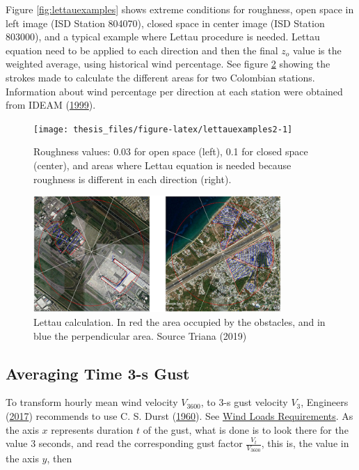 \documentclass[12pt,oneside]{reedthesis}
\begin{document}
Figure \ref{fig:lettauexamples} shows extreme conditions for roughness, open space in left image (ISD Station 804070), closed space in center image (ISD Station 803000), and a typical example where Lettau procedure is needed. Lettau equation need to be applied to each direction and then the final \(z_o\) value is the weighted average, using historical wind percentage. See figure \ref{fig:lettauvalues} showing the strokes made to calculate the different areas for two Colombian stations. Information about wind percentage per direction at each station were obtained from IDEAM (\protect\hyperlink{ref-ideam1999}{1999}).
\begin{figure}

{\centering \texttt{[image: thesis\_files/figure-latex/lettauexamples2-1]} 

}

\caption{Roughness values: 0.03 for open space (left), 0.1 for closed space (center), and areas where Lettau equation is needed because roughness is different in each direction (right).}\label{fig:lettauexamples2}
\end{figure}
\begin{figure}

{\centering \includegraphics[width=3.71in]{figure/lettauvalues} 

}

\caption{Lettau calculation. In red the area occupied by the obstacles, and in blue the perpendicular area. Source Triana (2019)}\label{fig:lettauvalues}
\end{figure}
\hypertarget{rmd-gust}{%
\subsection{Averaging Time 3-s Gust}\label{rmd-gust}}

To transform hourly mean wind velocity \(V_{3600}\), to 3-s gust velocity \(V_3\), Engineers (\protect\hyperlink{ref-Asce2017}{2017}) recommends to use C. S. Durst (\protect\hyperlink{ref-Durst1960}{1960}). See \protect\hyperlink{windloadsrequirements}{Wind Loads Requirements}. As the axis \(x\) represents duration \(t\) of the gust, what is done is to look there for the value 3 seconds, and read the corresponding gust factor \(\frac{V_t}{V_{3600}}\), this is, the value in the axis \(y\), then
\end{document}

